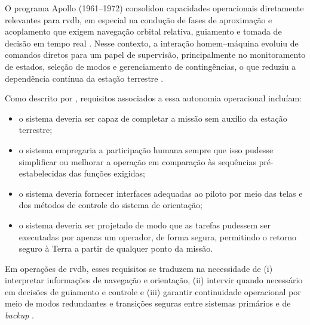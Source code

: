 O programa Apollo (1961--1972) consolidou capacidades operacionais diretamente relevantes para \gls{rvdb}, em especial na condução de fases de aproximação e acoplamento que exigem navegação orbital relativa, guiamento e tomada de decisão em tempo real \cite{RVDBapollo}.
Nesse contexto, a interação homem--máquina evoluiu de comandos diretos para um papel de supervisão, principalmente no monitoramento de estados, seleção de modos e gerenciamento de contingências, o que reduziu a dependência contínua da estação terrestre \cite{nevins1971}.

Como descrito por \cite{nevins1971}, requisitos associados a essa autonomia operacional incluíam:

\begin{itemize}
    \item o sistema deveria ser capaz de completar a missão sem auxílio da estação terrestre;
    \item o sistema empregaria a participação humana sempre que isso pudesse simplificar ou melhorar a operação em comparação às sequências pré-estabelecidas das funções exigidas;
    \item o sistema deveria fornecer interfaces adequadas ao piloto por meio das telas e dos métodos de controle do sistema de orientação;
    \item o sistema deveria ser projetado de modo que as tarefas pudessem ser executadas por apenas um operador, de forma segura, permitindo o retorno seguro à Terra a partir de qualquer ponto da missão.
\end{itemize}


Em operações de \gls{rvdb}, esses requisitos se traduzem na necessidade de (i) interpretar informações de navegação e orientação, (ii) intervir quando necessário em decisões de guiamento e controle e (iii) garantir continuidade operacional por meio de modos redundantes e transições seguras entre sistemas primários e de \emph{backup} \cite{nevins1971}.
